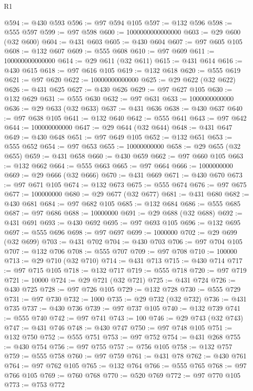 \begin{lexlean}{R1}
\begin{coremodule}
{{{{{{{{{{{{{{{{{{{{{{{{{{{{{{{{{{{{{{{{{{{{{{{{{{{{{{{{{{{{{{{{{{{{{{{{{{{{{{{{{{{{{{{{{{{{{{{{{{{{{{{{{{{{{{{{{{{{{{{{{{{{{{{{{{{{{{{{{{{{{{{{{{{{{{{{{{{{{{{{{{{{{{{{{{{{{{{{{{{{{{{{{{@594 := @430 @593
@596 := @97 @594 @105
@597 := @132 @596
@598 := @555 @597
@599 := @97 @598
@600 := 1000000000000000
@603 := @29 @600 (@32 @600)
@604 := @431 @603
@605 := @430 @604
@607 := @97 @605 @105
@608 := @132 @607
@609 := @555 @608
@610 := @97 @609
@611 := 100000000000000
@614 := @29 @611 (@32 @611)
@615 := @431 @614
@616 := @430 @615
@618 := @97 @616 @105
@619 := @132 @618
@620 := @555 @619
@621 := @97 @620
@622 := 10000000000000
@625 := @29 @622 (@32 @622)
@626 := @431 @625
@627 := @430 @626
@629 := @97 @627 @105
@630 := @132 @629
@631 := @555 @630
@632 := @97 @631
@633 := 1000000000000
@636 := @29 @633 (@32 @633)
@637 := @431 @636
@638 := @430 @637
@640 := @97 @638 @105
@641 := @132 @640
@642 := @555 @641
@643 := @97 @642
@644 := 100000000000
@647 := @29 @644 (@32 @644)
@648 := @431 @647
@649 := @430 @648
@651 := @97 @649 @105
@652 := @132 @651
@653 := @555 @652
@654 := @97 @653
@655 := 10000000000
@658 := @29 @655 (@32 @655)
@659 := @431 @658
@660 := @430 @659
@662 := @97 @660 @105
@663 := @132 @662
@664 := @555 @663
@665 := @97 @664
@666 := 1000000000
@669 := @29 @666 (@32 @666)
@670 := @431 @669
@671 := @430 @670
@673 := @97 @671 @105
@674 := @132 @673
@675 := @555 @674
@676 := @97 @675
@677 := 100000000
@680 := @29 @677 (@32 @677)
@681 := @431 @680
@682 := @430 @681
@684 := @97 @682 @105
@685 := @132 @684
@686 := @555 @685
@687 := @97 @686
@688 := 10000000
@691 := @29 @688 (@32 @688)
@692 := @431 @691
@693 := @430 @692
@695 := @97 @693 @105
@696 := @132 @695
@697 := @555 @696
@698 := @97 @697
@699 := 1000000
@702 := @29 @699 (@32 @699)
@703 := @431 @702
@704 := @430 @703
@706 := @97 @704 @105
@707 := @132 @706
@708 := @555 @707
@709 := @97 @708
@710 := 100000
@713 := @29 @710 (@32 @710)
@714 := @431 @713
@715 := @430 @714
@717 := @97 @715 @105
@718 := @132 @717
@719 := @555 @718
@720 := @97 @719
@721 := 10000
@724 := @29 @721 (@32 @721)
@725 := @431 @724
@726 := @430 @725
@728 := @97 @726 @105
@729 := @132 @728
@730 := @555 @729
@731 := @97 @730
@732 := 1000
@735 := @29 @732 (@32 @732)
@736 := @431 @735
@737 := @430 @736
@739 := @97 @737 @105
@740 := @132 @739
@741 := @555 @740
@742 := @97 @741
@743 := 100
@746 := @29 @743 (@32 @743)
@747 := @431 @746
@748 := @430 @747
@750 := @97 @748 @105
@751 := @132 @750
@752 := @555 @751
@753 := @97 @752
@754 := @431 @268
@755 := @430 @754
@756 := @97 @755
@757 := @756 @105
@758 := @132 @757
@759 := @555 @758
@760 := @97 @759
@761 := @431 @78
@762 := @430 @761
@764 := @97 @762 @105
@765 := @132 @764
@766 := @555 @765
@768 := @97 @766 @105
@769 := @760 @768
@770 := @520 @769
@772 := @97 @770 @105
@773 := @753 @772
}}}}}}}}}}}}}}}}}}}}}}}}}}}}}}}}}}}}}}}}}}}}}}}}}}}}}}}}}}}}}}}}}}}}}}}}}}}}}}}}}}}}}}}}}}}}}}}}}}}}}}}}}}}}}}}}}}}}}}}}}}}}}}}}}}}}}}}}}}}}}}}}}}}}}}}}}}}}}}}}}}}}}}}}}}}}}}}}}}}}}}}}}}
\end{coremodule}
\end{lexlean}
